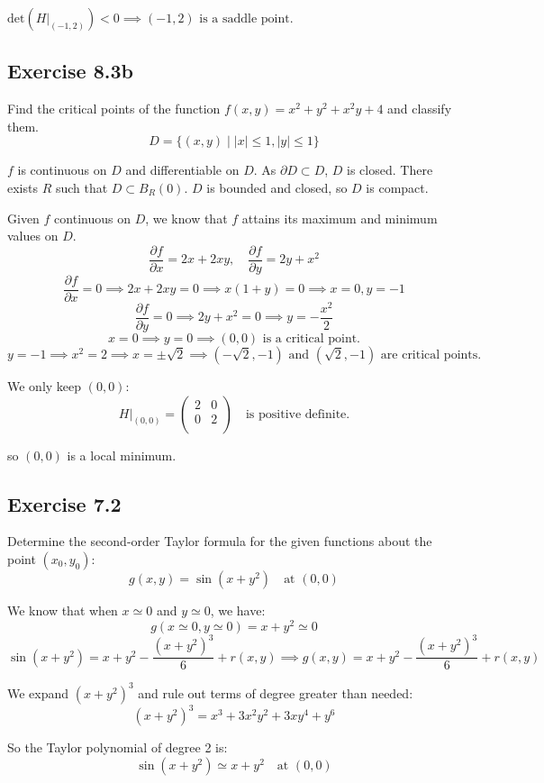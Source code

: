 \documentclass[11pt]{article}
\begin{document}
$\text{det}(H\big|_{(-1,2)}) < 0 \implies (-1,2) \text{ is a saddle point.}$

\subsection*{Exercise 8.3b}
Find the critical points of the function $f(x,y) = x^2+ y^2+x^2y+4$ and classify them.
\[
D = \{(x,y) \mid |x| \leq 1, |y| \leq 1\} 
\]

$f$ is continuous on $D$ and differentiable on $D$. As $\partial D \subset D$, $D$ is closed. There exists $R$ such that $D \subset B_R(0)$. $D$ is bounded and closed, so $D$ is compact.

Given $f$ continuous on $D$, we know that $f$ attains its maximum and minimum values on $D$.
\[
\frac{\partial f}{\partial x} = 2x + 2xy, \quad \frac{\partial f}{\partial y} = 2y + x^2
\]
\[
\frac{\partial f}{\partial x} = 0 \implies 2x + 2xy = 0 \implies x(1 + y) = 0 \implies x = 0, y = -1
\]
\[
\frac{\partial f}{\partial y} = 0 \implies 2y + x^2 = 0 \implies y = -\frac{x^2}{2}
\]
\[
x = 0 \implies y = 0 \implies (0,0) \text{ is a critical point.}
\]
\[
y = -1 \implies x^2 = 2 \implies x = \pm \sqrt{2} \implies (-\sqrt{2}, -1) \text{ and } (\sqrt{2}, -1) \text{ are critical points.}
\]

We only keep $(0,0)$:
\[
H\big|_{(0,0)} = \begin{pmatrix}
    2 & 0 \\
    0 & 2 \\
\end{pmatrix} \quad \text{is positive definite.}
\]

so $(0,0)$ is a local minimum.

\subsection*{Exercise 7.2}
Determine the second-order Taylor formula for the given functions about the point
$(x_0, y_0)$:
\[
g(x,y) = \sin(x + y^2) \quad \text{at } (0,0)
\]

We know that when $x \simeq 0$ and $y \simeq 0$, we have:
\[
g(x \simeq 0, y \simeq 0) = x + y^2 \simeq 0
\]
\[
\sin(x + y^2) = x + y^2 - \frac{(x + y^2)^3}{6} + r(x,y) \implies g(x,y) = x + y^2 - \frac{(x + y^2)^3}{6} + r(x,y)
\]

We expand $(x + y^2)^3$ and rule out terms of degree greater than needed:
\[
(x + y^2)^3 = x^3 + 3x^2y^2 + 3xy^4 + y^6 
\]

So the Taylor polynomial of degree 2 is:
\[
\sin(x + y^2) \simeq x + y^2 \quad \text{at } (0,0)
\]
\end{document}

